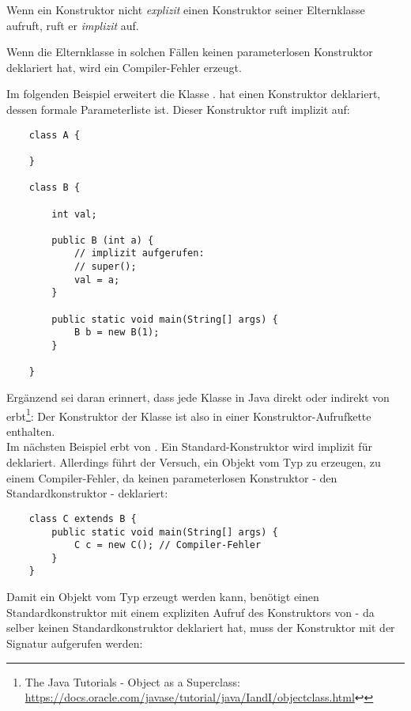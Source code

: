 \noindent
Wenn ein Konstruktor nicht \textit{explizit} einen Konstruktor seiner Elternklasse aufruft, ruft er \textit{implizit}  auf.

\noindent
Wenn die Elternklasse in solchen Fällen keinen parameterlosen Konstruktor deklariert hat, wird ein Compiler-Fehler erzeugt.

\noindent
Im folgenden Beispiel erweitert  die Klasse .  hat einen Konstruktor deklariert, dessen
formale Parameterliste  ist. Dieser Konstruktor ruft implizit  auf:

\begin{verbatim}
    class A {

    }

    class B {

        int val;

        public B (int a) {
            // implizit aufgerufen:
            // super();
            val = a;
        }

        public static void main(String[] args) {
            B b = new B(1);
        }

    }
\end{verbatim}

\noindent
Ergänzend sei daran erinnert, dass jede Klasse in Java direkt oder indirekt von  erbt\footnote{
    The Java Tutorials - Object as a Superclass: \url{https://docs.oracle.com/javase/tutorial/java/IandI/objectclass.html}↩
}: Der Konstruktor der Klasse  ist also in einer Konstruktor-Aufrufkette enthalten.\\

\noindent
Im nächsten Beispiel erbt   von . Ein Standard-Konstruktor wird implizit für  deklariert. Allerdings
führt der Versuch, ein Objekt vom Typ  zu erzeugen, zu einem Compiler-Fehler, da  keinen parameterlosen
Konstruktor - den Standardkonstruktor - deklariert:


\begin{verbatim}
    class C extends B {
        public static void main(String[] args) {
            C c = new C(); // Compiler-Fehler
        }
    }
\end{verbatim}

\noindent
Damit ein Objekt vom Typ  erzeugt werden kann, benötigt  einen Standardkonstruktor mit einem expliziten
Aufruf des Konstruktors von  - da  selber keinen Standardkonstruktor deklariert hat, muss der Konstruktor
mit der Signatur  aufgerufen werden:


